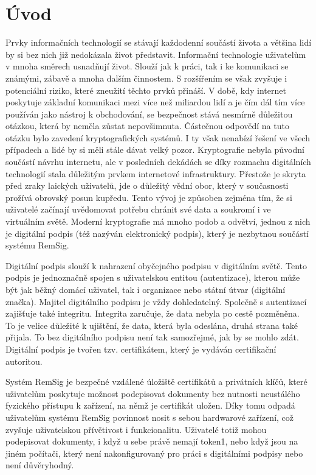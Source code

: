 \documentclass[]{fithesis3}
\begin{document}
\chapter{Úvod}

Prvky informačních technologií se stávají každodenní součástí života a většina lidí by si bez nich již nedokázala život představit. Informační technologie uživatelům v mnoha směrech usnadňují život. Slouží jak k práci, tak i ke komunikaci se známými, zábavě a mnoha dalším činnostem. S rozšířením se však zvyšuje i potenciální riziko, které zneužití těchto prvků přináší. V době, kdy internet poskytuje základní komunikaci mezi více než miliardou lidí a je čím dál tím více používán jako nástroj k obchodování, se bezpečnost stává nesmírně důležitou otázkou, která by neměla zůstat nepovšimnuta. Částečnou odpovědí na tuto otázku bylo zavedení kryptografických systémů. I ty však nenabízí řešení ve všech případech a lidé by si měli stále dávat velký pozor. Kryptografie nebyla původní součástí návrhu internetu, ale v posledních dekádách se díky rozmachu digitálních technologií stala důležitým prvkem internetové infrastruktury. Přestože je skryta před zraky laických uživatelů, jde o důležitý vědní obor, který v současnosti prožívá obrovský posun kupředu. Tento vývoj je způsoben zejména tím, že si uživatelé začínají uvědomovat potřebu chránit své data a soukromí i ve virtuálním světě. Moderní kryptografie má mnoho podob a odvětví, jednou z nich je digitální podpis (též nazýván elektronický podpis), který je nezbytnou součástí systému RemSig.

Digitální podpis slouží k nahrazení obyčejného podpisu v digitálním světě. Tento podpis je jednoznačně spojen s uživatelskou entitou (autentizace), kterou může být jak běžný domácí uživatel, tak i organizace nebo státní útvar (digitální značka). Majitel digitálního podpisu je vždy dohledatelný. Společně s autentizací zajišťuje také integritu. Integrita zaručuje, že data nebyla po cestě pozměněna. To je velice důležité k ujištění, že data, která byla odeslána, druhá strana také přijala. To bez digitálního podpisu není tak samozřejmé, jak by se mohlo zdát. Digitální podpis je tvořen tzv. certifikátem, který je vydáván certifikační autoritou.

Systém RemSig je bezpečné vzdálené úložiště certifikátů a privátních klíčů, které uživatelům poskytuje možnost podepisovat dokumenty bez nutnosti neustálého fyzického přístupu k zařízení, na němž je certifikát uložen. Díky tomu odpadá uživatelům systému RemSig povinnost nosit s sebou hardwarové zařízení, což zvyšuje uživatelskou přívětivost i funkcionalitu. Uživatelé totiž mohou podepisovat dokumenty, i když u sebe právě nemají token1, nebo když jsou na jiném počítači, který není nakonfigurovaný pro práci s digitálními podpisy nebo není důvěryhodný.
\end{document}
